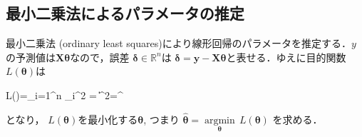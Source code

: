 \subsection{最小二乗法によるパラメータの推定}
最小二乗法 (ordinary least squares)により線形回帰のパラメータを推定する．$y$の予測値は$\mathbf{X} \mathbf{\theta}$なので，誤差 $\mathbf{\delta} \in \mathbb{R}^n$は
$\mathbf{\delta} = \mathbf{y}-\mathbf{X} \mathbf{\theta}$と表せる．ゆえに目的関数$L(\mathbf{\theta})$は 


L(\theta)=\sum_{i=1}^n \delta_i^2 = \|\mathbf{\delta}\|^2=\mathbf{\delta}^\top \mathbf{\delta}


となり， $L(\mathbf{\theta})$を最小化する$\mathbf{\theta}$, つまり $\hat {\mathbf {\theta }}={\underset {\mathbf {\theta}}{\operatorname {arg min} }}\,L({\mathbf{\theta}})$
を求める．

